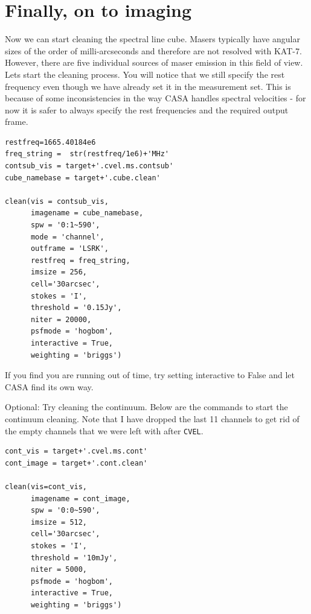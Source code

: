 \documentclass[force,almostfull,justified]{tufte-book}
\begin{document}
\section{Finally, on to imaging}

Now we can start cleaning the spectral line cube.  Masers typically have angular sizes of the order of
milli-arcseconds and therefore  are not resolved with KAT-7.  However, there are five individual
sources of maser emission in this field of view.  Lets start the cleaning process.  You will notice
that we still specify the rest frequency even though we have already set it in the measurement set.
This is because of some inconsistencies in the way CASA handles spectral velocities - for now it is
safer to always specify the rest frequencies and the required output frame.

\begin{casacmd}
\begin{verbatim}
restfreq=1665.40184e6
freq_string =  str(restfreq/1e6)+'MHz'
contsub_vis = target+'.cvel.ms.contsub'
cube_namebase = target+'.cube.clean'

clean(vis = contsub_vis,
      imagename = cube_namebase,
      spw = '0:1~590',
      mode = 'channel',
      outframe = 'LSRK',
      restfreq = freq_string,
      imsize = 256,
      cell='30arcsec',
      stokes = 'I',
      threshold = '0.15Jy',
      niter = 20000,
      psfmode = 'hogbom',
      interactive = True,
      weighting = 'briggs')
\end{verbatim}
\end{casacmd}

If you find you are running out of time, try setting interactive to False and let CASA find its own
way.

Optional: Try cleaning the continuum.  Below are the commands to start the continuum cleaning.  Note
that I have dropped the last 11 channels to get rid of the empty channels that we were left with after
{\tt CVEL}.

\begin{casacmd}
\begin{verbatim}
cont_vis = target+'.cvel.ms.cont'
cont_image = target+'.cont.clean'

clean(vis=cont_vis,
      imagename = cont_image,
      spw = '0:0~590',
      imsize = 512,
      cell='30arcsec',
      stokes = 'I',
      threshold = '10mJy',
      niter = 5000,
      psfmode = 'hogbom',
      interactive = True,
      weighting = 'briggs')
\end{verbatim}
\end{casacmd}
\end{document}
